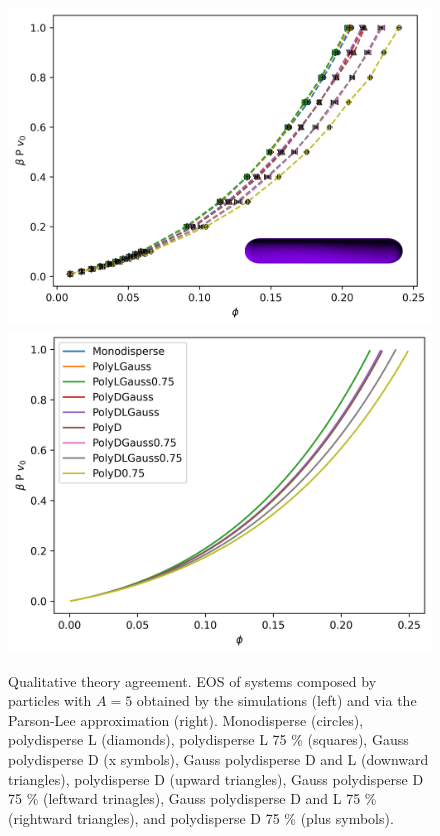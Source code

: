 \documentclass[journal=jacsat,manuscript=article]{achemso}
\begin{document}
\begin{figure}[!h]
	\centering
	\includegraphics[width=0.45 \columnwidth]{Figures/EOS_A5.png}
	\includegraphics[width=0.45 \columnwidth]{Figures/EOS_Th_A5.png}
	\caption{Qualitative theory agreement. EOS of systems composed by particles with $A = 5$ obtained by the simulations (left) and via the Parson-Lee approximation (right). Monodisperse (circles), polydisperse L (diamonds), polydisperse L 75 \% (squares), Gauss polydisperse D (x symbols), Gauss polydisperse D and L (downward triangles), polydisperse D (upward triangles), Gauss polydisperse D 75 \% (leftward trinagles), Gauss polydisperse D and L 75 \% (rightward triangles), and polydisperse D 75 \% (plus symbols).}
	\label{fig:A5_comparison}
\end{figure}
\end{document}
